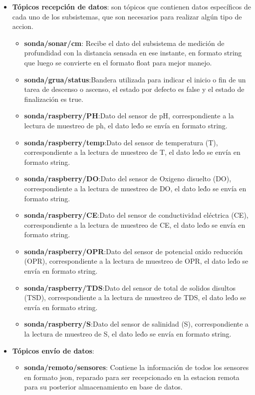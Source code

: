 \begin{appendices}
\begin{itemize}
\begin{itemize}
    \end{itemize}
    \item \textbf{T\'opicos recepci\'on de datos}: son t\'opicos que contienen datos espec\'ificos de cada uno de los subsistemas, que son necesarios para realizar alg\'un tipo de accion. 
        \begin{itemize}
        \item \textbf{sonda/sonar/cm}: Recibe el dato del subsistema de medici\'on de profundidad con la distancia sensada en ese instante, en formato string que luego se convierte en el formato float para mejor manejo. 
        \item \textbf{sonda/grua/status}:Bandera utilizada para indicar el inicio o fin de un tarea de descenso o ascenso, el estado por defecto es false y el estado de finalizaci\'on es true.
        \item \textbf{sonda/raspberry/PH}:Dato del sensor de pH, correspondiente a la lectura de muestreo de ph, el dato le\'do se env\'ia en formato string.
        \item \textbf{sonda/raspberry/temp}:Dato del sensor de temperatura (T), correspondiente a la lectura de muestreo de T, el dato le\'do se env\'ia en formato string.
        \item \textbf{sonda/raspberry/DO}:Dato del sensor de Oxigeno disuelto (DO), correspondiente a la lectura de muestreo de DO, el dato le\'do se env\'ia en formato string.
        \item \textbf{sonda/raspberry/CE}:Dato del sensor de conductividad el\'ectrica (CE), correspondiente a la lectura de muestreo de CE, el dato le\'do se env\'ia en formato string.
        \item \textbf{sonda/raspberry/OPR}:Dato del sensor de potencial oxido reducci\'on (OPR), correspondiente a la lectura de muestreo de OPR, el dato le\'do se env\'ia en formato string.
        \item \textbf{sonda/raspberry/TDS}:Dato del sensor de total de solidos disultos (TSD), correspondiente a la lectura de muestreo de TDS, el dato le\'do se env\'ia en formato string.
        \item \textbf{sonda/raspberry/S}:Dato del sensor de salinidad (S), correspondiente a la lectura de muestreo de S, el dato le\'do se env\'ia en formato string.
    \end{itemize}
    \item \textbf{T\'opicos env\'io de datos}:
        \begin{itemize}
        \item \textbf{sonda/remoto/sensores}: Contiene la informaci\'on de todos los sensores en formato json, reparado para ser recepcionado en la estacion remota para su posterior almacenamiento en base de datos. 
    \end{itemize}
    

\end{itemize}
\end{appendices}
